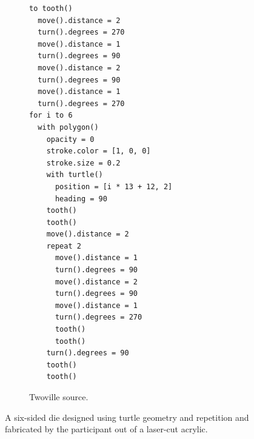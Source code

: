\begin{figure}
\begin{subfigure}{0.3\linewidth}
\centering
\begin{minipage}{\linewidth}
\small
\begin{Verbatim}
to tooth()
  move().distance = 2
  turn().degrees = 270
  move().distance = 1
  turn().degrees = 90
  move().distance = 2
  turn().degrees = 90
  move().distance = 1
  turn().degrees = 270
for i to 6
  with polygon()
    opacity = 0
    stroke.color = [1, 0, 0]
    stroke.size = 0.2
    with turtle()
      position = [i * 13 + 12, 2]
      heading = 90
    tooth()
    tooth()
    move().distance = 2
    repeat 2
      move().distance = 1
      turn().degrees = 90
      move().distance = 2
      turn().degrees = 90
      move().distance = 1
      turn().degrees = 270
      tooth()
      tooth()
    turn().degrees = 90
    tooth()
    tooth()
\end{Verbatim}
\end{minipage}
\caption{Twoville source.}
\label{figure:d6_program}
\end{subfigure}%
\caption{A six-sided die designed using turtle geometry and repetition and fabricated by the participant out of a laser-cut acrylic.}
\label{figure:d6}
\end{figure}

